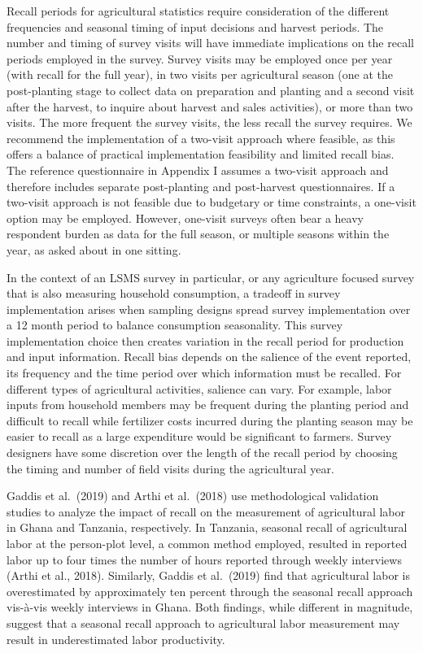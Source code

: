 \documentclass[
]{book}
\begin{document}
Recall periods for agricultural statistics require consideration of the different frequencies and seasonal timing of input decisions and harvest periods. The number and timing of survey visits will have immediate implications on the recall periods employed in the survey. Survey visits may be employed once per year (with recall for the full year), in two visits per agricultural season (one at the post-planting stage to collect data on preparation and planting and a second visit after the harvest, to inquire about harvest and sales activities), or more than two visits. The more frequent the survey visits, the less recall the survey requires. We recommend the implementation of a two-visit approach where feasible, as this offers a balance of practical implementation feasibility and limited recall bias. The reference questionnaire in Appendix I assumes a two-visit approach and therefore includes separate post-planting and post-harvest questionnaires. If a two-visit approach is not feasible due to budgetary or time constraints, a one-visit option may be employed. However, one-visit surveys often bear a heavy respondent burden as data for the full season, or multiple seasons within the year, as asked about in one sitting.

In the context of an LSMS survey in particular, or any agriculture focused survey that is also measuring household consumption, a tradeoff in survey implementation arises when sampling designs spread survey implementation over a 12 month period to balance consumption seasonality. This survey implementation choice then creates variation in the recall period for production and input information. Recall bias depends on the salience of the event reported, its frequency and the time period over which information must be recalled. For different types of agricultural activities, salience can vary. For example, labor inputs from household members may be frequent during the planting period and difficult to recall while fertilizer costs incurred during the planting season may be easier to recall as a large expenditure would be significant to farmers. Survey designers have some discretion over the length of the recall period by choosing the timing and number of field visits during the agricultural year.

Gaddis et al.~(2019) and Arthi et al.~(2018) use methodological validation studies to analyze the impact of recall on the measurement of agricultural labor in Ghana and Tanzania, respectively. In Tanzania, seasonal recall of agricultural labor at the person-plot level, a common method employed, resulted in reported labor up to four times the number of hours reported through weekly interviews (Arthi et al., 2018). Similarly, Gaddis et al.~(2019) find that agricultural labor is overestimated by approximately ten percent through the seasonal recall approach vis-à-vis weekly interviews in Ghana. Both findings, while different in magnitude, suggest that a seasonal recall approach to agricultural labor measurement may result in underestimated labor productivity.
\end{document}
